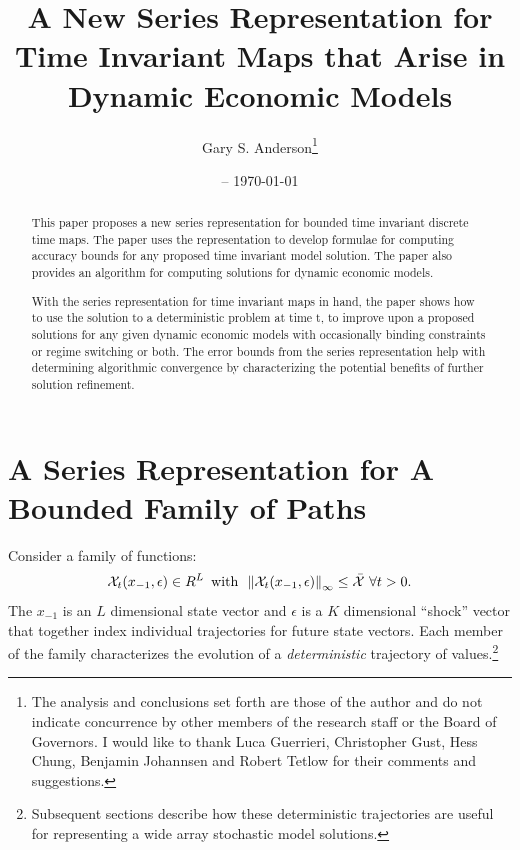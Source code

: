 \documentclass[12pt]{article}
\title{A New Series Representation for Time Invariant Maps that
 Arise in  Dynamic Economic Models}
\date{\currenttime -- \today }
\author{Gary S. Anderson\thanks{The analysis and conclusions set forth are those of the author and do not indicate concurrence by other members of the research staff or the Board of Governors. I would like to thank Luca Guerrieri, Christopher Gust, Hess Chung, Benjamin Johannsen  and Robert Tetlow for their comments and suggestions. }}
\begin{document}
\maketitle

\begin{abstract}


 
This paper proposes a new series representation for bounded
time invariant discrete time maps.
The paper uses the representation to develop  formulae
for computing accuracy bounds for any proposed time invariant model solution.
The paper also provides an algorithm for computing
solutions for dynamic economic models.

With the series representation for time invariant maps in hand,
the paper shows how to use the solution to a deterministic problem at
time t, to improve upon a proposed solutions for
any given dynamic economic models with occasionally
binding constraints or regime switching or both.   The error bounds from the
series representation help with determining algorithmic convergence by
characterizing the potential benefits
of further solution refinement.




\end{abstract}

 \newpage
 \tableofcontents
 \newpage






\section{A Series Representation for A Bounded Family of Paths}
\label{sec:seri-repr-bound}

Consider a family of functions:
 \begin{gather}
   \mathcal{X}_{t}(x_{-1},\epsilon) \in{R^L}\,\text{ with }\,\left\lVert\mathcal{X}_{t}(x_{-1},\epsilon)\right\rVert_\infty  \le \bar{\mathcal{X}}\,\,\forall t> 0 \label{fFamily}.
 \end{gather}
The $x_{-1}$ is an  $L$ dimensional state vector and $\epsilon$ is a $K$ dimensional ``shock'' vector that together index
individual trajectories for future state vectors.  
Each member of the family characterizes the evolution of a {\em deterministic} trajectory of values.\footnote{Subsequent sections describe how these deterministic trajectories are useful for representing a wide array stochastic model solutions.}
\end{document}
